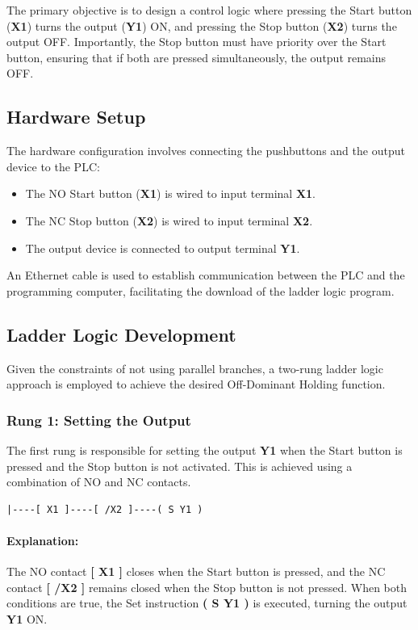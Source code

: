 \documentclass[12pt]{article}
\begin{document}
The primary objective is to design a control logic where pressing the Start button (\textbf{X1}) turns the output (\textbf{Y1}) ON, and pressing the Stop button (\textbf{X2}) turns the output OFF. Importantly, the Stop button must have priority over the Start button, ensuring that if both are pressed simultaneously, the output remains OFF.

\subsection{Hardware Setup}

The hardware configuration involves connecting the pushbuttons and the output device to the PLC:

\begin{itemize}
    \item The NO Start button (\textbf{X1}) is wired to input terminal \textbf{X1}.
    \item The NC Stop button (\textbf{X2}) is wired to input terminal \textbf{X2}.
    \item The output device is connected to output terminal \textbf{Y1}.
\end{itemize}

An Ethernet cable is used to establish communication between the PLC and the programming computer, facilitating the download of the ladder logic program.

\subsection{Ladder Logic Development}

Given the constraints of not using parallel branches, a two-rung ladder logic approach is employed to achieve the desired Off-Dominant Holding function.

\subsubsection{Rung 1: Setting the Output}

The first rung is responsible for setting the output \textbf{Y1} when the Start button is pressed and the Stop button is not activated. This is achieved using a combination of NO and NC contacts.

\begin{lstlisting}[language={}, frame=single]
|----[ X1 ]----[ /X2 ]----( S Y1 )
\end{lstlisting}

\paragraph{Explanation:} 
The NO contact \textbf{[ X1 ]} closes when the Start button is pressed, and the NC contact \textbf{[ /X2 ]} remains closed when the Stop button is not pressed. When both conditions are true, the Set instruction \textbf{( S Y1 )} is executed, turning the output \textbf{Y1} ON.
\end{document}
